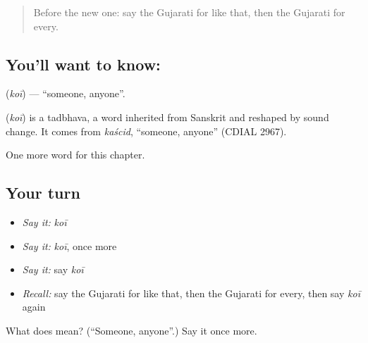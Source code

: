 \label{lesson:GU-C99-koi}



\begin{quote}
Before the new one: say the Gujarati for like that, then the Gujarati for every.
\end{quote}

\subsection*{You'll want to know: }
\textbf{} (\emph{koī}) — \textquotedblleft{}someone, anyone\textquotedblright{}.

\begin{cousinweb}
\textbf{} (\emph{koī}) is a tadbhava, a word inherited from Sanskrit and reshaped by sound change. It comes from \emph{kaścid}, \textquotedblleft{}someone, anyone\textquotedblright{} (CDIAL 2967).
\end{cousinweb}

\begin{grammarlens}[title={What you've built}]
One more word for this chapter.
\end{grammarlens}

\subsection*{Your turn}
\begin{itemize}
\raggedright
  \item \emph{Say it:} \emph{koī}
  \item \emph{Say it:} \emph{koī}, once more
  \item \emph{Say it:} say \emph{koī}
  \item \emph{Recall:} say the Gujarati for like that, then the Gujarati for every, then say \emph{koī} again
\end{itemize}

\begin{tcolorbox}[breakable,colback=teal!4,colframe=teal!35!black,title={Before you move on}]
What does  mean? (\textquotedblleft{}Someone, anyone\textquotedblright{}.) Say it once more.
\end{tcolorbox}
